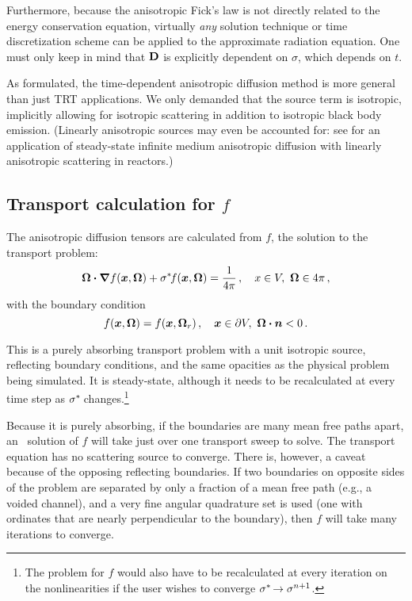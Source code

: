 Furthermore, because the anisotropic Fick's law is not directly related to the
energy conservation equation, virtually \emph{any} solution technique or time
discretization scheme can be applied to the approximate radiation equation. One
must only keep in mind that $\mathbf{D}$ is explicitly dependent on $\sigma$, which
depends on $t$.

As formulated, the time-dependent anisotropic diffusion method is more general
than just TRT applications. We only demanded that the source term is isotropic,
implicitly allowing for isotropic scattering in addition to isotropic black body
emission. (Linearly anisotropic sources may even be accounted for: see
\cite{Kel2010} for an application of steady-state infinite medium anisotropic
diffusion with linearly anisotropic scattering in reactors.)

\subsection{Transport calculation for \texorpdfstring{$f$}{f}}

The anisotropic diffusion tensors are calculated from $f$, the solution to the
transport problem:
\begin{equation*}
    \bm{\Omega}\bm{\cdot} \bm{\nabla} f(\bm{x}, \bm{\Omega})
    + \sigma^{*\!} f (\bm{x}, \bm{\Omega})
  = \frac{1}{4\pi} \,, \quad x \in V,\ \bm{\Omega} \in 4\pi\,,
\end{equation*}
with the boundary condition
\begin{equation*}
  f(\bm{x}, \bm{\Omega}) = f(\bm{x}, \bm{\Omega}_r) \,,
 \quad \bm{x} \in \partial V, \ \bm{\Omega} \bm{\cdot} \bm{n} < 0\,.
\end{equation*}

This is a purely absorbing transport problem with a unit isotropic source,
reflecting boundary conditions, and the same opacities as the physical problem
being simulated. It is steady-state, although it needs to be recalculated at
every time step as $\sigma^{*\!}$ changes.\footnote{The problem for $f$ would also
have to be recalculated at every iteration on the nonlinearities if the user
wishes to converge $\sigma^{*\!} \to \sigma^{n+1}$.}

Because it is purely absorbing, if the boundaries are many mean free paths
apart, an \SN\ solution of $f$ will take just over one transport sweep to
solve.
The transport equation has no scattering source to converge.
There is, however, a caveat because of the opposing reflecting boundaries. If
two boundaries on opposite sides of the problem are separated by only a
fraction of a mean free path (e.g., a voided channel), and a very fine angular
quadrature set is used (one with ordinates that are nearly perpendicular to the
boundary), then $f$ will take many iterations to converge.

